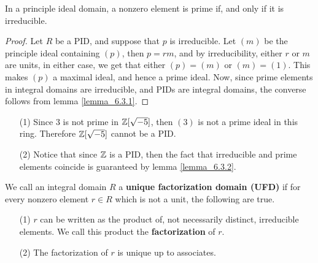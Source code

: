 \begin{lemma}\label{lemma_6.3.2}
  In a principle ideal domain, a nonzero element is prime if, and only if it
  is irreducible.
\end{lemma}
\begin{proof}
  Let $R$ be a PID, and suppose that $p$ is irreducible. Let $(m)$ be the
  principle ideal containing $(p)$, then $p=rm$, and by irreducibility, either
  $r$ or $m$ are units, in either case, we get that either $(p)=(m)$ or
  $(m)=(1)$. This makes $(p)$ a maximal ideal, and hence a prime
  ideal. Now, since prime elements in integral domains are
  irreducible, and PIDs are integral domains, the converse follows
  from lemma \ref{lemma_6.3.1}.
\end{proof}

\begin{example}\label{example_6.7}
  \begin{enumerate}
    \item[(1)] Since $3$ is not prime in  $\mathbb{Z}[\sqrt{-5}]$, then $(3)$ is not
      a prime ideal in this ring. Therefore $\mathbb{Z}[\sqrt{-5}]$ cannot be a
      PID.

    \item[(2)] Notice that since $\mathbb{Z}$ is a PID, then the fact that
      irreducible and prime elements coincide is guaranteed by lemma
      \ref{lemma_6.3.2}.
  \end{enumerate}
\end{example}

\begin{definition}
  We call an integral domain $R$ a  \textbf{unique factorization domain (UFD)}
  if for every nonzero element $r \in R$ which is not a unit, the following
  are true.
  \begin{enumerate}
    \item[(1)] $r$ can be written as the product of, not necessarily distinct,
      irreducible elements. We call this product the
      \textbf{factorization} of $r$.

    \item[(2)] The factorization of $r$ is unique up to associates.
  \end{enumerate}
\end{definition}


